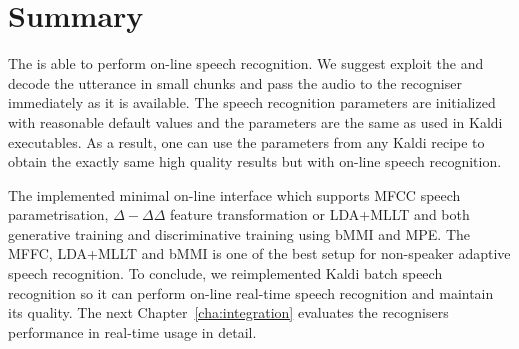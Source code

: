 \section{Summary}
\label{sec:onl_summary}
The  is able to perform on-line speech recognition.
We suggest exploit the  and decode the utterance in small chunks and pass the audio to the recogniser immediately as it is available.
The speech recognition parameters are initialized with reasonable default values and the parameters are the same as used in Kaldi executables. 
As a result, one can use the parameters from any Kaldi recipe to obtain the exactly same high quality results but with on-line speech recognition.

The implemented minimal on-line interface which supports \ac{MFCC} speech parametrisation, $\Delta-\Delta\Delta$ feature transformation or \ac{LDA}+\ac{MLLT} and both generative training and discriminative training using \ac{bMMI} and \ac{MPE}.
The \ac{MFFC}, \ac{LDA}+\ac{MLLT} and \ac{bMMI} is one of the best setup for non-speaker adaptive speech recognition.
To conclude, we reimplemented Kaldi batch speech recognition so it can perform on-line real-time speech recognition and maintain its quality.
The next Chapter~\ref{cha:integration} evaluates the recognisers performance in real-time usage in detail.
